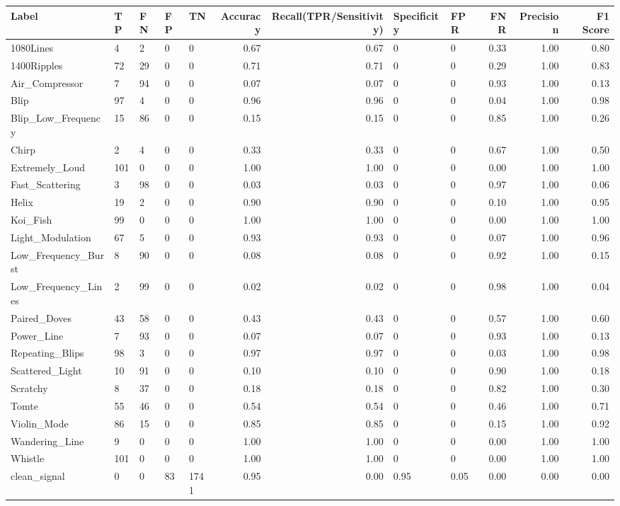 \begin{tabular}{lllllrrllrrr}
\toprule
Label & TP & FN & FP & TN & Accuracy & Recall(TPR/Sensitivity) & Specificity & FPR & FNR & Precision & F1 Score \\
\midrule
1080Lines & 4 & 2 & 0 & 0 & 0.67 & 0.67 & 0 & 0 & 0.33 & 1.00 & 0.80 \\
1400Ripples & 72 & 29 & 0 & 0 & 0.71 & 0.71 & 0 & 0 & 0.29 & 1.00 & 0.83 \\
Air\_Compressor & 7 & 94 & 0 & 0 & 0.07 & 0.07 & 0 & 0 & 0.93 & 1.00 & 0.13 \\
Blip & 97 & 4 & 0 & 0 & 0.96 & 0.96 & 0 & 0 & 0.04 & 1.00 & 0.98 \\
Blip\_Low\_Frequency & 15 & 86 & 0 & 0 & 0.15 & 0.15 & 0 & 0 & 0.85 & 1.00 & 0.26 \\
Chirp & 2 & 4 & 0 & 0 & 0.33 & 0.33 & 0 & 0 & 0.67 & 1.00 & 0.50 \\
Extremely\_Loud & 101 & 0 & 0 & 0 & 1.00 & 1.00 & 0 & 0 & 0.00 & 1.00 & 1.00 \\
Fast\_Scattering & 3 & 98 & 0 & 0 & 0.03 & 0.03 & 0 & 0 & 0.97 & 1.00 & 0.06 \\
Helix & 19 & 2 & 0 & 0 & 0.90 & 0.90 & 0 & 0 & 0.10 & 1.00 & 0.95 \\
Koi\_Fish & 99 & 0 & 0 & 0 & 1.00 & 1.00 & 0 & 0 & 0.00 & 1.00 & 1.00 \\
Light\_Modulation & 67 & 5 & 0 & 0 & 0.93 & 0.93 & 0 & 0 & 0.07 & 1.00 & 0.96 \\
Low\_Frequency\_Burst & 8 & 90 & 0 & 0 & 0.08 & 0.08 & 0 & 0 & 0.92 & 1.00 & 0.15 \\
Low\_Frequency\_Lines & 2 & 99 & 0 & 0 & 0.02 & 0.02 & 0 & 0 & 0.98 & 1.00 & 0.04 \\
Paired\_Doves & 43 & 58 & 0 & 0 & 0.43 & 0.43 & 0 & 0 & 0.57 & 1.00 & 0.60 \\
Power\_Line & 7 & 93 & 0 & 0 & 0.07 & 0.07 & 0 & 0 & 0.93 & 1.00 & 0.13 \\
Repeating\_Blips & 98 & 3 & 0 & 0 & 0.97 & 0.97 & 0 & 0 & 0.03 & 1.00 & 0.98 \\
Scattered\_Light & 10 & 91 & 0 & 0 & 0.10 & 0.10 & 0 & 0 & 0.90 & 1.00 & 0.18 \\
Scratchy & 8 & 37 & 0 & 0 & 0.18 & 0.18 & 0 & 0 & 0.82 & 1.00 & 0.30 \\
Tomte & 55 & 46 & 0 & 0 & 0.54 & 0.54 & 0 & 0 & 0.46 & 1.00 & 0.71 \\
Violin\_Mode & 86 & 15 & 0 & 0 & 0.85 & 0.85 & 0 & 0 & 0.15 & 1.00 & 0.92 \\
Wandering\_Line & 9 & 0 & 0 & 0 & 1.00 & 1.00 & 0 & 0 & 0.00 & 1.00 & 1.00 \\
Whistle & 101 & 0 & 0 & 0 & 1.00 & 1.00 & 0 & 0 & 0.00 & 1.00 & 1.00 \\
clean\_signal & 0 & 0 & 83 & 1741 & 0.95 & 0.00 & 0.95 & 0.05 & 0.00 & 0.00 & 0.00 \\
\bottomrule
\end{tabular}
